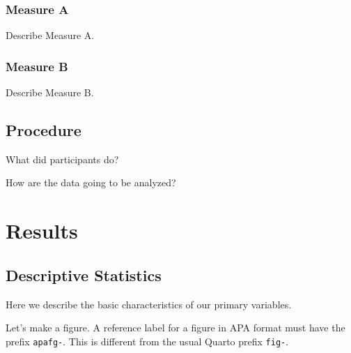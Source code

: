 \documentclass[
  man,
  colorlinks=true,linkcolor=blue,citecolor=blue,urlcolor=blue]{apa7}
\begin{document}
\hypertarget{measure-a}{%
\subsubsection{Measure A}\label{measure-a}}

Describe Measure A.

\hypertarget{measure-b}{%
\subsubsection{Measure B}\label{measure-b}}

Describe Measure B.

\hypertarget{procedure}{%
\subsection{Procedure}\label{procedure}}

What did participants do?

How are the data going to be analyzed?

\hypertarget{results}{%
\section{Results}\label{results}}

\hypertarget{descriptive-statistics}{%
\subsection{Descriptive Statistics}\label{descriptive-statistics}}

Here we describe the basic characteristics of our primary variables.

Let's make a figure. A reference label for a figure in APA format must
have the prefix \texttt{apafg-}. This is different from the usual Quarto
prefix \texttt{fig-}.
\end{document}
